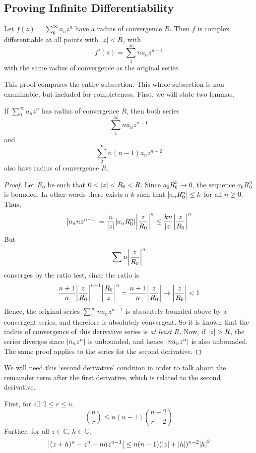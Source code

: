 \subsection{Proving Infinite Differentiability}
\begin{theorem}
	Let \(f(z) = \sum_0^\infty a_n z^n\) have a radius of convergence \(R\). Then \(f\) is complex differentiable at all points with \(\abs{z} < R\), with
	\[ f'(z) = \sum_1^\infty n a_n z^{n-1} \]
	with the same radius of convergence as the original series.
\end{theorem}
\noindent This proof comprises the entire subsection. This whole subsection is non-examinable, but included for completeness. First, we will state two lemmas.
\begin{lemma}
	If \(\sum_0^\infty a_n z^n\) has radius of convergence \(R\), then both series
	\[ \sum_1^\infty n a_n z^{n-1} \]
	and
	\[ \sum_2^\infty n(n-1)a_n z^{n-2} \]
	also have radius of convergence \(R\).
\end{lemma}
\begin{proof}
	Let \(R_0\) be such that \(0 < \abs{z} < R_0 < R\). Since \(a_0 R_0^n \to 0\), the sequence \(a_0 R_0^n\) is bounded. In other words there exists a \(k\) such that \(\abs{a_n R_0^n} \leq k\) for all \(n \geq 0\). Thus,
	\[ \abs{a_n n z^{n-1}} = \frac{n}{\abs{z}}\abs{a_n R_0^n} \abs{\frac{z}{R_0}}^n \leq \frac{kn}{\abs{z}}\abs{\frac{z}{R_0}}^n \]
	But
	\[ \sum n\abs{\frac{z}{R_0}}^n \]
	converges by the ratio test, since the ratio is
	\[ \frac{n+1}{n}\abs{\frac{z}{R_0}}^{n+1} \abs{\frac{R_0}{z}}^n = \frac{n+1}{n}\abs{\frac{z}{R_0}} \to \abs{\frac{z}{R_0}} < 1 \]
	Hence, the original series \(\sum_1^\infty n a_n z^{n-1}\) is absolutely bounded above by a convergent series, and therefore is absolutely convergent. So it is known that the radius of convergence of this derivative series is \textit{at least} \(R\). Now, if \(\abs{z} > R\), the series diverges since \(\abs{a_n z^n}\) is unbounded, and hence \(\abs{n a_n z^n}\) is also unbounded. The same proof applies to the series for the second derivative.
\end{proof}
\noindent We will need this `second derivative' condition in order to talk about the remainder term after the first derivative, which is related to the second derivative.
\begin{lemma}
	First, for all \(2 \leq r \leq n\).
	\[ \binom{n}{r} \leq n(n-1)\binom{n-2}{r-2} \]
	Further, for all \(z \in \mathbb C\), \(h \in \mathbb C\),
	\[ \abs{(z + h)^n - z^n - nhz^{n-1}} \leq n(n-1)(\abs{z} + \abs{h})^{n-2}\abs{h}^2 \]
\end{lemma}
